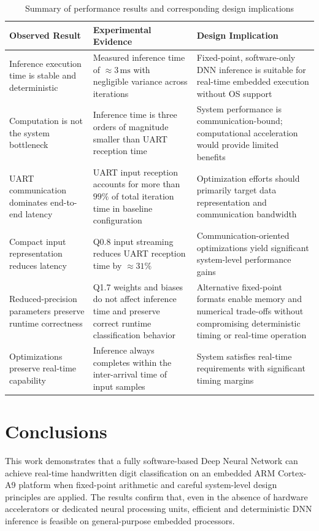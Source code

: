 \begin{table}[H]
\centering
\caption{Summary of performance results and corresponding design implications}
\label{tab:design_implications}
\renewcommand{\arraystretch}{1.25}
\begin{tabular}{|p{3.8cm}|p{4.6cm}|p{5.4cm}|}
\hline
\textbf{Observed Result} & \textbf{Experimental Evidence} & \textbf{Design Implication} \\
\hline
Inference execution time is stable and deterministic &
Measured inference time of $\approx 3\,\mathrm{ms}$ with negligible variance across iterations &
Fixed-point, software-only DNN inference is suitable for real-time embedded execution without OS support \\
\hline
Computation is not the system bottleneck &
Inference time is three orders of magnitude smaller than UART reception time &
System performance is communication-bound; computational acceleration would provide limited benefits \\
\hline
UART communication dominates end-to-end latency &
UART input reception accounts for more than $99\%$ of total iteration time in baseline configuration &
Optimization efforts should primarily target data representation and communication bandwidth \\
\hline
Compact input representation reduces latency &
Q0.8 input streaming reduces UART reception time by $\approx 31\%$ &
Communication-oriented optimizations yield significant system-level performance gains \\
\hline
Reduced-precision parameters preserve runtime correctness &
Q1.7 weights and biases do not affect inference time and preserve correct
runtime classification behavior &
Alternative fixed-point formats enable memory and numerical trade-offs without
compromising deterministic timing or real-time operation \\
\hline
Optimizations preserve real-time capability &
Inference always completes within the inter-arrival time of input samples &
System satisfies real-time requirements with significant timing margins \\
\hline
\end{tabular}
\end{table}

\chapter{Conclusions}

This work demonstrates that a fully software-based Deep Neural Network can achieve
real-time handwritten digit classification on an embedded ARM Cortex-A9 platform
when fixed-point arithmetic and careful system-level design principles are applied.
The results confirm that, even in the absence of hardware accelerators or dedicated
neural processing units, efficient and deterministic DNN inference is feasible on
general-purpose embedded processors.

